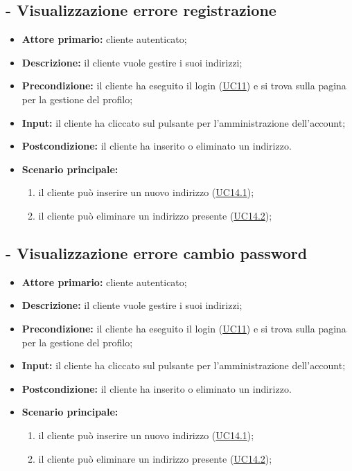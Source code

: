 \stepUserCase
\subsection{ - Visualizzazione errore registrazione}
\begin{itemize}
    \item \textbf{Attore primario:} cliente autenticato;
    \item \textbf{Descrizione:} il cliente vuole gestire i suoi indirizzi;
    \item \textbf{Precondizione:} il cliente ha eseguito il login (\hyperref[UC11]{UC11}) e si trova sulla pagina per la gestione del profilo;
    \item \textbf{Input:} il cliente ha cliccato sul pulsante per l'amministrazione dell'account;
    \item \textbf{Postcondizione:} il cliente ha inserito o eliminato un indirizzo.
    \item \textbf{Scenario principale:}
          \begin{enumerate}
              \item il cliente può inserire un nuovo indirizzo (\hyperref[UC14.1]{UC14.1});
              \item il cliente può eliminare un indirizzo presente (\hyperref[UC14.2]{UC14.2});
          \end{enumerate}
\end{itemize}

\stepUserCase
\subsection{ - Visualizzazione errore cambio password}
\begin{itemize}
    \item \textbf{Attore primario:} cliente autenticato;
    \item \textbf{Descrizione:} il cliente vuole gestire i suoi indirizzi;
    \item \textbf{Precondizione:} il cliente ha eseguito il login (\hyperref[UC11]{UC11}) e si trova sulla pagina per la gestione del profilo;
    \item \textbf{Input:} il cliente ha cliccato sul pulsante per l'amministrazione dell'account;
    \item \textbf{Postcondizione:} il cliente ha inserito o eliminato un indirizzo.
    \item \textbf{Scenario principale:}
          \begin{enumerate}
              \item il cliente può inserire un nuovo indirizzo (\hyperref[UC14.1]{UC14.1});
              \item il cliente può eliminare un indirizzo presente (\hyperref[UC14.2]{UC14.2});
          \end{enumerate}
\end{itemize}

